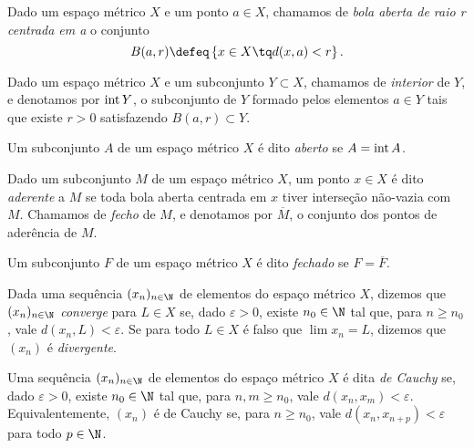 \begin{defn}
    Dado um espaço métrico \( X \) e um ponto \( a \in X \), chamamos de \emph{bola aberta de raio r centrada em a} o conjunto \[
        B(a, r) \defeq \left\{ x \in X \tq d(x, a) < r \right\}
    .\]
\end{defn}

\begin{defn}
    Dado um espaço métrico \( X \) e um subconjunto \( Y \subset X \), chamamos de \emph{interior} de \( Y \), e denotamos por \( \operatorname{int} Y \), o subconjunto de \( Y \) formado pelos elementos \( a \in Y \) tais que existe \( r > 0 \) satisfazendo \( B(a, r) \subset Y \).
\end{defn}

\begin{defn}
    Um subconjunto \( A \) de um espaço métrico \( X \) é dito \emph{aberto} se \( A = \operatorname{int} A \).
\end{defn}

\begin{defn}
    Dado um subconjunto \( M \) de um espaço métrico \( X \), um ponto \( x \in X \) é dito \emph{aderente} a \( M \) se toda bola aberta centrada em \( x \) tiver interseção não-vazia com \( M \).
    Chamamos de \emph{fecho} de \( M \), e denotamos por \( \overline{M} \), o conjunto dos pontos de aderência de \( M \).
\end{defn}

\begin{defn}
    Um subconjunto \( F \) de um espaço métrico \( X \) é dito \emph{fechado} se \( F = \overline{F} \).
\end{defn}

\begin{defn}
    Dada uma sequência \( (x_{ n })_{ n \in \N } \) de elementos do espaço métrico \( X \), dizemos que \( (x_{ n })_{ n \in \N } \) \emph{converge} para \( L \in X \) se, dado \( \varepsilon > 0 \), existe \( n_{ 0 } \in \N \) tal que, para \( n \geq n_{ 0 } \), vale \( d(x_{ n }, L) < \varepsilon \).
    Se para todo \( L \in X \) é falso que \( \lim x_{ n } = L \), dizemos que \( ( x_{ n } ) \) é \emph{divergente}.
\end{defn}

\begin{defn}
    Uma sequência \( (x_{ n })_{ n \in \N } \) de elementos do espaço métrico \( X \) é dita \emph{de Cauchy} se, dado \( \varepsilon > 0 \), existe \( n_{ 0 } \in \N \) tal que, para \( n, m \geq n_{ 0 } \), vale \( d(x_{ n }, x_{ m }) < \varepsilon \).
    Equivalentemente, \( (x_{ n }) \) é de Cauchy se, para \( n \geq n_{ 0 } \), vale \( d(x_{ n }, x_{ n+p }) < \varepsilon \) para todo \( p \in \N \).
\end{defn}

